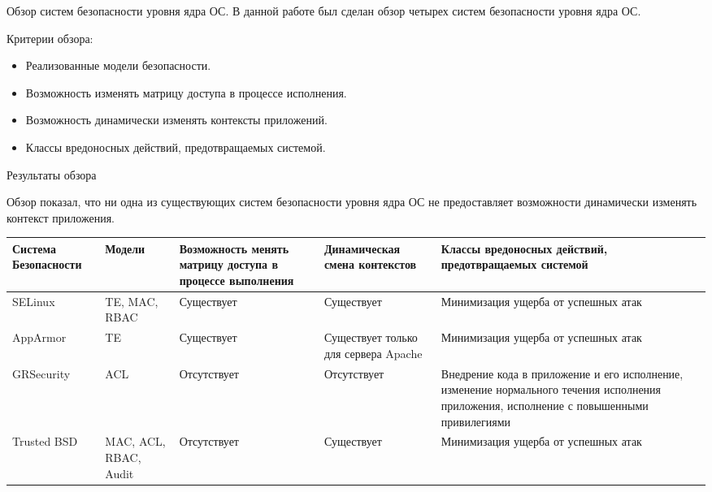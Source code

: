 \documentclass{beamer}
\begin{document}
\begin{frame}{Обзор систем безопасности уровня ядра ОС.}
В данной работе был сделан обзор четырех систем безопасности уровня ядра ОС.

\begin{block}{Критерии обзора:}

\begin{itemize}
 \item Реализованные модели безопасности.
 \item Возможность изменять матрицу доступа в процессе исполнения.
 \item Возможность динамически изменять контексты приложений.
 \item Классы вредоносных действий, предотвращаемых системой.
\end{itemize}
\end{block}
\end{frame}

\begin{frame}[fragile]{Результаты обзора}

Обзор показал, что ни одна из существующих систем безопасности
уровня ядра ОС не предоставляет возможности динамически изменять
контекст приложения.

\begin{tiny}
\begin{center}
\begin{tabular}{|p{2cm}|p{1.5cm}|p{2cm}|p{2cm}|p{2cm}|} 
\hline
Система Безопасности & Модели & Возможность менять матрицу 
доступа в процессе выполнения & 
Динамическая смена контекстов & Классы вредоносных действий,
предотвращаемых системой \\
\hline 
SELinux & TE, MAC, RBAC & Существует & Существует & 
Минимизация ущерба от успешных атак \\
\hline
AppArmor & TE & Существует & Существует только для сервера Apache & 
Минимизация ущерба от успешных атак \\ 
\hline 
GRSecurity & ACL & Отсутствует & Отсутствует & Внедрение кода в приложение 
и его исполнение, изменение нормального течения исполнения приложения, 
исполнение с повышенными привилегиями \\ 
\hline 
Trusted BSD & MAC, ACL, RBAC, Audit & Отсутствует & Существует & 
Минимизация ущерба от успешных атак \\ 
\hline
\end{tabular} 
\end{center} 
\end{tiny} 
 
\end{frame}
\end{document}
